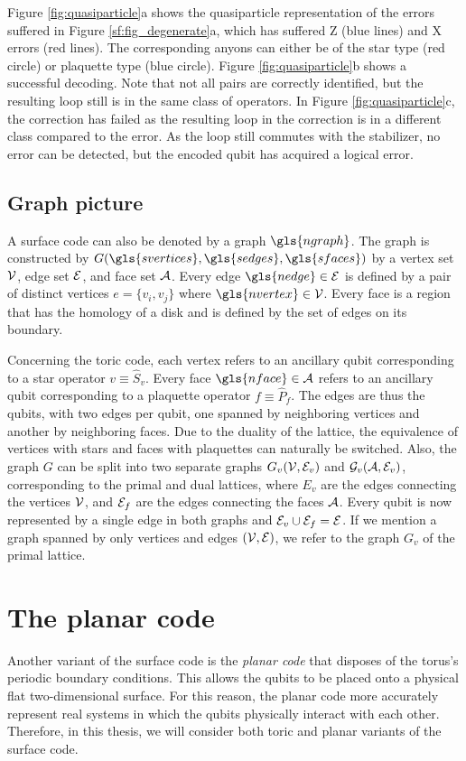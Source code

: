 Figure \ref{fig:quasiparticle}a shows the quasiparticle representation of the errors suffered in Figure \ref{sf:fig_degenerate}a, which has suffered Z (blue lines) and X errors (red lines). The corresponding anyons can either be of the star type (red circle) or plaquette type (blue circle). Figure \ref{fig:quasiparticle}b shows a successful decoding. Note that not all pairs are correctly identified, but the resulting loop still is in the same class of operators. In Figure \ref{fig:quasiparticle}c, the correction has failed as the resulting loop in the correction is in a different class compared to the error. As the loop still commutes with the stabilizer, no error can be detected, but the encoded qubit has acquired a logical error.


\subsection{Graph picture}\label{sec:toricgraph}
A surface code can also be denoted by a graph $\gls{ngraph}$. The graph is constructed by $G(\gls{svertices}, \gls{sedges}, \gls{sfaces})$ by a vertex set $\mathcal{V}$, edge set $\mathcal{E}$, and face set $\mathcal{A}$. Every edge $\gls{nedge}\in \m{E}$ is defined by a pair of distinct vertices $e=\{v_i, v_j\}$ where $\gls{nvertex}\in \m{V}$. Every face is a region that has the homology of a disk and is defined by the set of edges on its boundary. 

Concerning the toric code, each vertex refers to an ancillary qubit corresponding to a star operator $v\equiv \hat{S}_v$. Every face $\gls{nface}\in \m{A}$ refers to an ancillary qubit corresponding to a plaquette operator $f\equiv \hat{P}_f$. The edges are thus the qubits, with two edges per qubit, one spanned by neighboring vertices and another by neighboring faces. Due to the duality of the lattice, the equivalence of vertices with stars and faces with plaquettes can naturally be switched. Also, the graph $G$ can be split into two separate graphs $G_v(\mathcal{V}, \mathcal{E}_v)$ and $\mathcal{G}_v(\mathcal{A}, \mathcal{E}_v)$, corresponding to the primal and dual lattices, where $E_v$ are the edges connecting the vertices $\mathcal{V}$, and $\mathcal{E}_f$ are the edges connecting the faces $\mathcal{A}$. Every qubit is now represented by a single edge in both graphs and $\mathcal{E}_v\cup \mathcal{E}_f=\mathcal{E}$. If we mention a graph spanned by only vertices and edges $(\mathcal{V},\mathcal{E})$, we refer to the graph $G_v$ of the primal lattice. 


\section{The planar code}\label{sec:surface_planar}
Another variant of the surface code is the \emph{planar code} that disposes of the torus's periodic boundary conditions. This allows the qubits to be placed onto a physical flat two-dimensional surface. For this reason, the planar code more accurately represent real systems in which the qubits physically interact with each other. Therefore, in this thesis, we will consider both toric and planar variants of the surface code.


